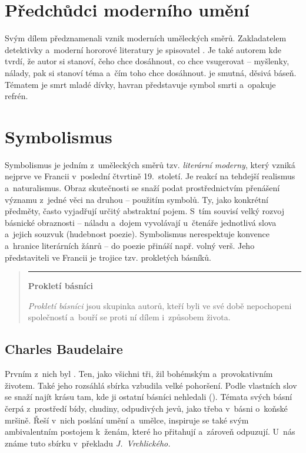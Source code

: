 \section{Předchůdci moderního umění}
Svým dílem předznamenali vznik moderních uměleckých směrů. Zakladatelem
detektivky a~moderní hororové literatury  je spisovatel .  Je také autorem  kde
tvrdí, že autor si stanoví, čeho chce dosáhnout, co chce vsugerovat --
myšlenky, nálady, pak si stanoví téma a~čím toho chce dosáhnout. 
 je smutná, děsivá báseň. Tématem je smrt mladé dívky,
havran představuje symbol smrti a~opakuje refrén.

\section{Symbolismus}
Symbolismus je jedním z~uměleckých směrů tzv. \emph{literární moderny}, který
vzniká nejprve ve Francii v~poslední čtvrtině 19.~století. Je reakcí na
tehdejší realismus a~naturalismus. Obraz skutečnosti se snaží podat
prostřednictvím přenášení významu z~jedné věci na druhou -- použitím
symbolů. Ty, jako konkrétní předměty, často vyjadřují určitý abstraktní
pojem. S~tím souvisí velký rozvoj básnické obraznosti -- náladu a~dojem
vyvolávají u~čtenáře jednotlivá slova a~jejich souzvuk (hudebnost
poezie). Symbolismus nerespektuje konvence a~hranice literárních žánrů --
do poezie přináší např. volný verš. Jeho představiteli ve Francii je
trojice tzv. prokletých básníků.

\begin{quote}
\vspace{3mm}
\hrule
{\Large \textbf{Prokletí básníci}}

\emph{Prokletí básníci} jsou skupinka autorů, kteří byli ve své době
nepochopeni společností a~bouří se proti ní dílem i~způsobem života. 
\end{quote}

\subsection*{Charles Baudelaire}
Prvním z~nich byl . Ten, jako všichni tři, žil
bohémským a~provokativním životem. Také jeho rozsáhlá sbírka  vzbudila velké pohoršení. Podle vlastních slov se snaží najít krásu
tam, kde ji ostatní básníci nehledali (). Témata
svých básní čerpá z~prostředí bídy, chudiny, odpudivých jevů, jako třeba
v~básni o~koňské mršině. Řeší v~nich poslání umění a~umělce, inspiruje
se také svým ambivalentním postojem k~ženám, které ho přitahují
a~zároveň odpuzují. U~nás známe tuto sbírku v~překladu \emph{J.~Vrchlického.}

